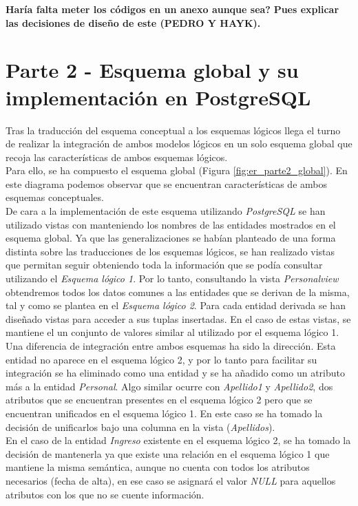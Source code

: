 \documentclass{article}
\begin{document}
\textbf{Haría falta meter los códigos en un anexo aunque sea?}
\textbf{Pues explicar las decisiones de diseño de este (PEDRO Y HAYK).}

\section{Parte 2 - Esquema global y su implementación en PostgreSQL}

Tras la traducción del esquema conceptual a los esquemas lógicos llega el turno de realizar la integración de ambos modelos lógicos en un solo esquema global que recoja las características de ambos esquemas lógicos.\\
Para ello, se ha compuesto el esquema global (Figura \ref{fig:er_parte2_global}). En este diagrama podemos observar que se encuentran características de ambos esquemas conceptuales. \\
De cara a la implementación de este esquema utilizando \emph{PostgreSQL} se han utilizado vistas con manteniendo los nombres de las entidades mostrados en el esquema global. Ya que las generalizaciones se habían planteado de una forma distinta sobre las traducciones de los esquemas lógicos, se han realizado vistas que permitan seguir obteniendo toda la información que se podía consultar utilizando el \emph{Esquema lógico 1}. Por lo tanto, consultando la vista \emph{Personalview} obtendremos todos los datos comunes a las entidades que se derivan de la misma, tal y como se plantea en el \emph{Esquema lógico 2}. Para cada entidad derivada se han diseñado vistas para acceder a sus tuplas insertadas. En el caso de estas vistas, se mantiene el un conjunto de valores similar al utilizado por el esquema lógico 1.\\
Una diferencia de integración entre ambos esquemas ha sido la dirección. Esta entidad no aparece en el esquema lógico 2, y por lo tanto para facilitar su integración se ha eliminado como una entidad y se ha añadido como un atributo más a la entidad \emph{Personal}. Algo similar ocurre con \emph{Apellido1} y \emph{Apellido2}, dos atributos que se encuentran presentes en el esquema lógico 2 pero que se encuentran unificados en el esquema lógico 1. En este caso se ha tomado la decisión de unificarlos bajo una columna en la vista (\emph{Apellidos}).\\
En el caso de la entidad \emph{Ingreso} existente en el esquema lógico 2, se ha tomado la decisión de mantenerla ya que existe una relación en el esquema lógico 1 que mantiene la misma semántica, aunque no cuenta con todos los atributos necesarios (fecha de alta), en ese caso se asignará el valor \emph{NULL} para aquellos atributos con los que no se cuente información.\\
\end{document}

